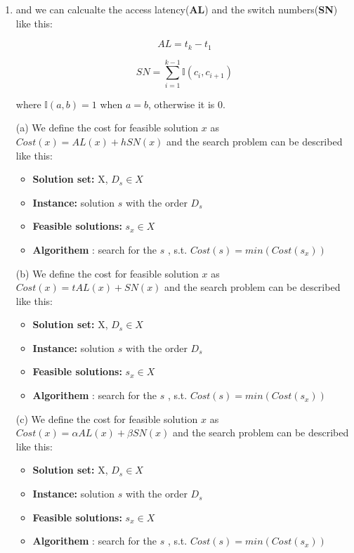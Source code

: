 \documentclass[12pt,a4paper]{article}
\makeatletter
\newtheorem*{solution}{Solution}
\theoremstyle{definition}
\renewenvironment{solution}[1][Solution] {\par\pushQED{\qed}\normalfont\topsep6\p@\@plus6\p@\relax\trivlist\item[\hskip\labelsep\bfseries#1\@addpunct{.}]\ignorespaces}{\popQED\endtrivlist\@endpefalse} \makeatother
\makeatother
\begin{document}
\begin{enumerate}
\begin{solution}
	and we can calcualte the access latency(\textbf{AL}) and the switch numbers(\textbf{SN}) like this:
	
	 \begin{equation*}
		 AL = t_k - t_1
	 \end{equation*}

	 \begin{equation*}
		SN = \sum_{i = 1}^{k-1} \mathbb{I}(c_i, c_{i + 1})
	\end{equation*}

	where $\mathbb{I}(a, b) = 1$ when $a=b$, otherwise it is $0$.

	(a) 
	 We define the cost for feasible solution $x$ as $Cost(x) =AL(x) +  hSN(x)$ and the search problem can be described like this:

	 \begin{itemize}
		\item \textbf{Solution set:} X, $D_s \in X$
        \item \textbf{Instance:} solution $s$ with the order $D_s$
        \item \textbf{Feasible solutions:} $s_x \in X$
        \item \textbf{Algorithem }: search for the $s$ , s.t. $Cost(s) = min(Cost(s_x))$
	 \end{itemize}



	 (b) 
	 We define the cost for feasible solution $x$ as $Cost(x) =tAL(x) +  SN(x)$ and the search problem can be described like this:

	 \begin{itemize}
		\item \textbf{Solution set:} X, $D_s \in X$
        \item \textbf{Instance:} solution $s$ with the order $D_s$
        \item \textbf{Feasible solutions:} $s_x \in X$
        \item \textbf{Algorithem }: search for the $s$ , s.t. $Cost(s) = min(Cost(s_x))$
	 \end{itemize}

	 (c) 
	 We define the cost for feasible solution $x$ as $Cost(x) =\alpha AL(x) +  \beta SN(x)$ and the search problem can be described like this:

	 \begin{itemize}
		\item \textbf{Solution set:} X, $D_s \in X$
        \item \textbf{Instance:} solution $s$ with the order $D_s$
        \item \textbf{Feasible solutions:} $s_x \in X$
        \item \textbf{Algorithem }: search for the $s$ , s.t. $Cost(s) = min(Cost(s_x))$
	 \end{itemize}


\end{solution}
\end{enumerate}
\end{document}
